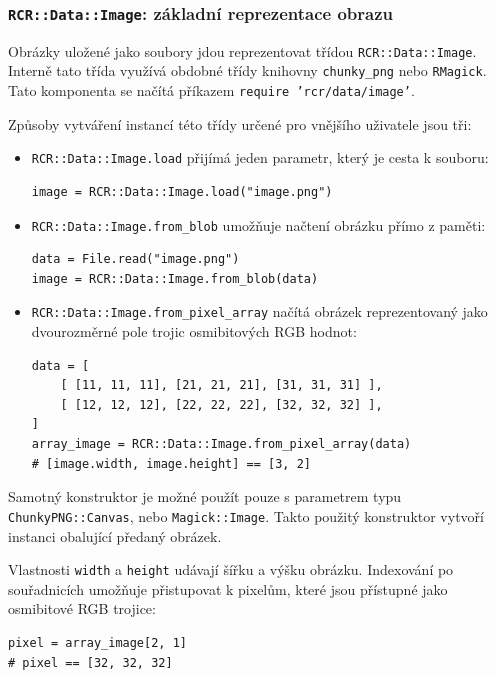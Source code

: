 \documentclass[a4paper]{article}
\begin{document}
\subsubsection{\texttt{RCR::Data::Image}: základní reprezentace obrazu}
Obrázky uložené jako soubory jdou reprezentovat třídou
\texttt{RCR::Data::Image}. Interně tato třída využívá obdobné třídy knihovny
\texttt{chunky\_png} nebo \texttt{RMagick}.
Tato komponenta se načítá příkazem \texttt{require 'rcr/data/image'}.

Způsoby vytváření instancí této třídy určené pro vnějšího uživatele jsou tři:
\begin{itemize}
\item \texttt{RCR::Data::Image.load} přijímá jeden parametr, který je cesta k
souboru:
\begin{lstlisting}
image = RCR::Data::Image.load("image.png")
\end{lstlisting}
\item \texttt{RCR::Data::Image.from\_blob} umožňuje načtení obrázku přímo z
paměti:
\begin{lstlisting}
data = File.read("image.png")
image = RCR::Data::Image.from_blob(data)
\end{lstlisting}
\item \texttt{RCR::Data::Image.from\_pixel\_array} načítá obrázek reprezentovaný
jako dvourozměrné pole trojic osmibitových RGB hodnot:
\begin{lstlisting}
data = [
	[ [11, 11, 11], [21, 21, 21], [31, 31, 31] ],
	[ [12, 12, 12], [22, 22, 22], [32, 32, 32] ],
]
array_image = RCR::Data::Image.from_pixel_array(data)
# [image.width, image.height] == [3, 2]
\end{lstlisting}
\end{itemize}

Samotný konstruktor je možné použít pouze s parametrem typu
\texttt{ChunkyPNG::Canvas}, nebo \texttt{Magick::Image}. Takto použitý
konstruktor vytvoří instanci obalující předaný obrázek.

Vlastnosti \texttt{width} a \texttt{height} udávají šířku a výšku obrázku.
Indexování po souřadnicích umožňuje přistupovat k pixelům, které jsou přístupné
jako osmibitové RGB trojice:
\begin{lstlisting}
pixel = array_image[2, 1]
# pixel == [32, 32, 32]
\end{lstlisting}
\end{document}
